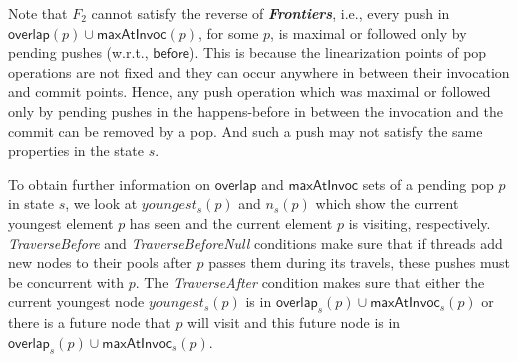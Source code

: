 
Note that $F_2$ cannot satisfy the reverse of {\bf \emph{Frontiers}}, i.e., every push in $\mathsf{overlap}(p) \cup \mathsf{maxAtInvoc}(p)$, for some $p$, is maximal or followed only by pending pushes (w.r.t., $\mathsf{before}$). This is because 
the linearization points of pop operations are not fixed and they can occur anywhere in between their invocation and commit points. Hence, any push operation which was maximal or followed only by pending pushes in the happens-before 
in between the invocation and the commit 
can be removed by a pop. And such a push may not satisfy the same properties in the state $s$. 

 To obtain further information on $\mathsf{overlap}$ and $\mathsf{maxAtInvoc}$ sets of a pending pop $p$ in state $s$, we look at $youngest_s(p)$ and $n_s(p)$ which show the current youngest element $p$ has seen and the current element $p$ is visiting, respectively. \emph{TraverseBefore} and \emph{TraverseBeforeNull} conditions make sure that if threads add new nodes to their pools after $p$ passes them during its travels, these pushes must be concurrent with $p$. The \emph{TraverseAfter} condition makes sure that either the current youngest node $youngest_s(p)$ is in $\mathsf{overlap}_s(p) \cup \mathsf{maxAtInvoc}_s(p)$ or there is a future node that $p$ will visit and this future node is in $\mathsf{overlap}_s(p) \cup \mathsf{maxAtInvoc}_s(p)$. 

